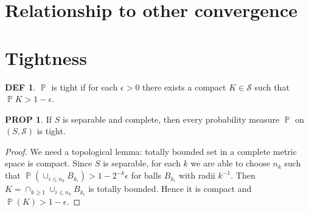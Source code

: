 \documentclass[hidelinks,11pt]{article}
\theoremstyle{definition}
\newtheorem*{defin}{DEF}
\theoremstyle{dotless}
\newtheorem{prop}{PROP}[section]
\theoremstyle{remark}
\DeclareMathOperator{\1}{\mathbf{1}}
\DeclareMathOperator{\p}{\mathbb{P}}
\begin{document}
\newpage
\section{Relationship to other convergence}

\section{Tightness}
\begin{defin}
$\p$ is tight if for each $\epsilon>0$ there exists a compact $K\in\mathcal{S}$ such that $\p K>1-\epsilon$.
\end{defin}
\begin{prop}
If $S$ is separable and complete, then every probability measure $\p$ on $(S,\mathcal{S})$ is tight.
\end{prop}
\begin{proof}
We need a topological lemma: totally bounded set in a complete metric space is compact.\smallbreak
Since $S$ is separable, for each $k$ we are able to choose $n_k$ such that $\p(\cup_{i\leq n_k}B_{k_i})>1-2^{-k}\epsilon$ for balls $B_{k_i}$ with radii $k^{-1}$. Then $K=\cap_{k\geq1}\cup_{i\leq n_k}B_{k_i}$ is totally bounded. Hence it is compact and $\p(K)>1-\epsilon$.
\end{proof}
\end{document}
